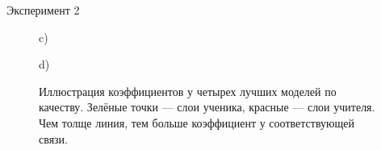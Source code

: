 \documentclass{beamer}
\begin{document}
\begin{frame}{Эксперимент 2}
\begin{figure}[H]
\begin{minipage}[h]{0.35\linewidth}
             c) \\
        \end{minipage}
        \hfill
        \begin{minipage}[h]{0.35\linewidth}
             d) \\
        \end{minipage}
        \caption{Иллюстрация коэффициентов у четырех лучших моделей по качеству. Зелёные точки --- слои ученика, красные --- слои учителя. Чем толще линия, тем больше коэффициент у соответствующей связи.}
    \end{figure}
\end{frame}

\end{document}
